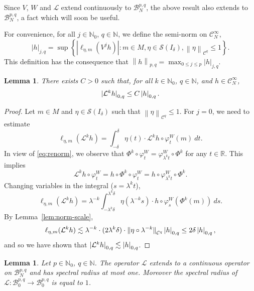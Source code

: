 \documentclass[a4paper,11pt]{amsart}
\newtheorem{lemma}[theorem]{Lemma}
\theoremstyle{remark}
\newcommand{\abs}[1]{\left|#1\right|} %
\newcommand{\cB}{\mathcal{B}} %
\newcommand{\cC}{\mathcal{C}} %
\newcommand{\cS}{\mathcal{S}} %
\newcommand{\cL}{\mathcal{L}} %
\newcommand{\bN}{\mathbb{N}} %
\newcommand{\bR}{\mathbb{R}} %
\newcommand{\norm}[1]{\left\|#1\right\|} %
\newcommand{\snorm}[1]{\left|#1\right|} %
\newcommand{\dv}{V} %
\newcommand{\dw}{W} %
\begin{document}
Since \(\dv\), \(\dw\) and \(\cL\) extend continuously to $\cB^{p,q}_{N}$, the above result also extends to $\cB^{p,q}_{N}$, a fact which will soon be useful.

For convenience, for all \(j\in \bN_0\), \(q\in\bN\), we define the semi-norm on \(\cC_N^{\infty}\),
\begin{equation}
    \label{eq:def-semi}
    \abs{h}_{j,q}= \sup
    \left\{ \abs{\ell_{\eta,m}(\dv^j h)} : m\in M, \eta \in \cS(I_{\delta}),  \norm{\eta}_{\cC^{q}}\leq 1\right\}.
\end{equation}
This definition has the consequence that \(\norm{h}_{p,q}= \displaystyle\max_{0\leq j \leq p} \abs{h}_{j,q}\).

\begin{lemma}
    \label{lem:LY-first}
    There exists \(C>0\) such that, for all \(k \in \bN_0\), \(q \in \bN\), and \(h\in \cC^{\infty}_{N}\),
    \[
        \snorm{\smash{\cL^k h}}_{0,q} \leq C \snorm{h}_{0,q}.
    \]
\end{lemma}

\begin{proof}
    Let \(m\in M\) and \(\eta \in \cS(I_{\delta})\) such that \(  \norm{\eta}_{\cC^{q}}\leq 1\).
    For $j =0$, we need to estimate
    \begin{equation}\label{eqn;lLk}
        \ell_{\eta,m}(\cL^k h)
        = \int_{-\delta}^{\delta} \eta(t) \cdot \cL^k h\circ \varphi_{t}^{\dw}(m) \ dt.
    \end{equation}
    In view of \eqref{eq:renorm}, we observe that \(\Phi^{k} \circ \varphi_{t}^{\dw} = \varphi_{\lambda^{k}t}^{\dw} \circ \Phi^{k}\) for any $t \in \bR$. 
    This implies 
    \[
        \cL^k h\circ \varphi_{t}^{\dw}
        = h\circ \Phi^{k} \circ \varphi_{t}^{\dw}
        = h\circ \varphi_{\lambda^{k}t}^{\dw} \circ \Phi^{k}.
    \]
    Changing variables in the integral (\(s= \lambda^k t\)),
    \[
        \ell_{\eta,m}(\cL^k h)
        = \lambda^{-k} \int_{-\lambda^k \delta}^{\lambda^k \delta} \eta(\lambda^{-k} s) \cdot h\circ \varphi_{s}^{\dw}(\Phi^{k}(m)) \ ds.
    \]
    By Lemma~\ref{lem:norm-scale},
    \[
        \ell_{\eta,m}(\cL^k h) \lesssim \lambda^{-k}\cdot(2\lambda^{k}\delta)\cdot\norm{\smash{\eta\circ \lambda^{-k}}}_{\cC^{q}}\snorm{h}_{0,q}\leq 2\delta\snorm{h}_{0,q},
    \]
    and so we have shown that \(\snorm{\smash{\cL^k h}}_{0,q} \lesssim \snorm{h}_{0,q}\).
\end{proof}

\begin{lemma}
    \label{lem:cont-op}
    Let \(p \in \bN_0\), \(q \in \bN\).
    The operator $\mathcal{L}$ extends to a continuous operator on $\cB_{N}^{p,q}$ and has spectral radius at most one. 
    Moreover the spectral radius of \(\cL  : \cB_{0}^{p,q} \to \cB_{0}^{p,q}\) is equal to \(1\).
\end{lemma}
\end{document}
